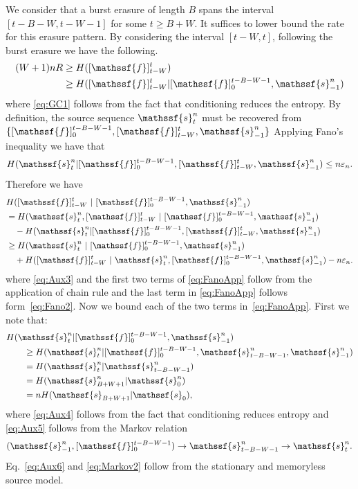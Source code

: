 \documentclass[journal, twocolumn, 10pt]{IEEEtran}
\newcommand{\eps}{\varepsilon}
\newcommand{\rvf}{{\mathssf{f}}}    %
\newcommand{\rvs}{{\mathssf{s}}}    %
\begin{document}
 We consider that a burst erasure of length $B$ spans the interval $[t-B-W, t-W-1]$ for some $t\ge B+W$. It suffices to lower bound the rate  for this erasure pattern. By considering the interval $[t-W, t]$, following the burst erasure we have the following.
\begin{align}
(W+1)nR &\ge H([\rvf]_{t-W}^{t})\notag\\
&\ge H([\rvf]_{t-W}^{t} | [\rvf]_{0}^{t-B-W-1}, \rvs^n_{-1}) \label{eq:GC1}
\end{align} where \eqref{eq:GC1} follows from the fact that conditioning reduces the entropy. 
By definition, the source sequence $\rvs_{t}^n$ must be recovered from $\{[\rvf]_{0}^{t-B-W-1}, [\rvf]_{t-W}^t, \rvs^n_{-1}\}$ Applying  Fano's inequality we have that 
\begin{align}
H(\rvs_{t}^n| [\rvf]_0^{t-B-W-1}, [\rvf]_{t-W}^t, \rvs_{-1}^n) \le n\eps_n. \label{eq:Fano2}
\end{align} Therefore we have 
\begin{align}
&H([\rvf]_{t-W}^{t}~|~[\rvf]_{0}^{t-B-W-1},\rvs_{-1}^n) \notag\\ &= H(\rvs^n_{t}, [\rvf]_{t-W}^{t}~|~[\rvf]_{0}^{t-B-W-1},\rvs_{-1}^n) \notag\\ &\quad- H(\rvs^n_{t} | [\rvf]_{0}^{t-B-W-1}, [\rvf]_{t-W}^{t},\rvs_{-1}^n)\label{eq:Aux3}\\
&\ge H(\rvs_{t}^n~|~[\rvf]_0^{t-B-W-1},\rvs_{-1}^n) \notag\\ &\quad+  H([\rvf]_{t-W}^{t}~|~\rvs_{t}^n, [\rvf]_{0}^{t-B-W-1},\rvs_{-1}^n) - n\eps_n.\label{eq:FanoApp}
\end{align} where \eqref{eq:Aux3} and the first two terms of \eqref{eq:FanoApp} follow from the application of chain rule and the last term in \eqref{eq:FanoApp} follows form~\eqref{eq:Fano2}.
Now we bound each of the two terms in~\eqref{eq:FanoApp}. First we note that:
\begin{align}
&H(\rvs_{t}^n|[\rvf]_0^{t-B-W-1},\rvs_{-1}^n) \notag\\
&\qquad \ge H(\rvs_{t}^n|[\rvf]_0^{t-B-W-1}, \rvs_{t-B-W-1}^n,\rvs_{-1}^n)\label{eq:Aux4}\\
&\qquad= H(\rvs_{t}^n|\rvs_{t-B-W-1}^n) \label{eq:Aux5}\\
&\qquad= H(\rvs_{B+W+1}^n|\rvs_{0}^n)\label{eq:Aux6} \\
&\qquad= nH(\rvs_{B+W+1}|\rvs_0),\label{eq:Markov2}
\end{align} where \eqref{eq:Aux4} follows from the fact that conditioning reduces entropy and \eqref{eq:Aux5} follows from the Markov relation $$(\rvs_{-1}^n,[\rvf]_0^{t-B-W-1}) \rightarrow \rvs_{t-B-W-1}^n \rightarrow \rvs_{t}^n.$$ Eq.~\eqref{eq:Aux6} and \eqref{eq:Markov2} follow from the stationary and memoryless  source model.
\end{document}
